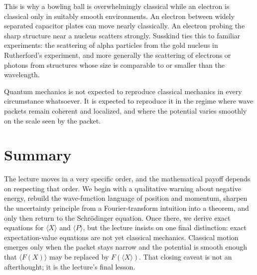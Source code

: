 This is why a bowling ball is overwhelmingly classical while an electron is classical only in suitably smooth environments. An electron between widely separated capacitor plates can move nearly classically. An electron probing the sharp structure near a nucleus scatters strongly. Susskind ties this to familiar experiments: the scattering of alpha particles from the gold nucleus in Rutherford's experiment, and more generally the scattering of electrons or photons from structures whose size is comparable to or smaller than the wavelength.

\begin{remark}
Quantum mechanics is not expected to reproduce classical mechanics in every circumstance whatsoever. It is expected to reproduce it in the regime where wave packets remain coherent and localized, and where the potential varies smoothly on the scale seen by the packet.
\end{remark}

\section{Summary}

The lecture moves in a very specific order, and the mathematical payoff depends on respecting that order. We begin with a qualitative warning about negative energy, rebuild the wave-function language of position and momentum, sharpen the uncertainty principle from a Fourier-transform intuition into a theorem, and only then return to the Schr\"odinger equation. Once there, we derive exact equations for \(\langle X\rangle\) and \(\langle P\rangle\), but the lecture insists on one final distinction: exact expectation-value equations are not yet classical mechanics. Classical motion emerges only when the packet stays narrow and the potential is smooth enough that \(\langle F(X)\rangle\) may be replaced by \(F(\langle X\rangle)\). That closing caveat is not an afterthought; it is the lecture's final lesson.
